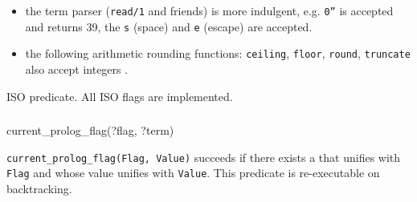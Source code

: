 \begin{itemize}

\item the term parser (\texttt{read/1} and friends) is more indulgent, e.g. \texttt{0''} is
  accepted and returns 39, the  \texttt{{\bs}s} (space) and
  \texttt{{\bs}e} (escape) are accepted.

\item the following arithmetic rounding functions: \texttt{ceiling}, \texttt{floor}, \texttt{round}, \texttt{truncate} also accept integers .

\end{itemize}

\begin{PlErrors}







\end{PlErrors}

\Portability

ISO predicate. All ISO flags are implemented.

\subsubsection{\label{current-prolog-flag/2}}

\begin{TemplatesOneCol}
current\_prolog\_flag(?flag, ?term)

\end{TemplatesOneCol}

\Description

\texttt{current\_prolog\_flag(Flag, Value)}
succeeds if there exists a  that unifies with
\texttt{Flag} and whose value unifies with \texttt{Value}. This predicate
is re-executable on backtracking.

